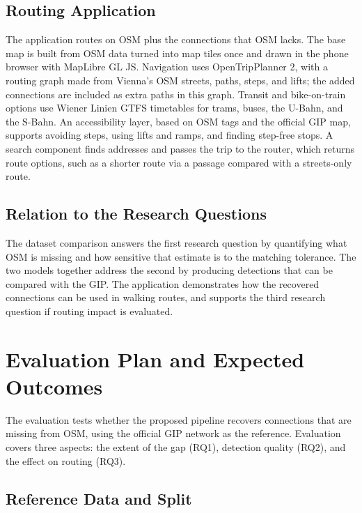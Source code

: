 \documentclass[conference]{IEEEtran}
\begin{document}
\subsection{Routing Application}

The application routes on OSM plus the connections that OSM lacks. The base map is built from OSM data turned into map tiles once and drawn in the phone browser with MapLibre GL JS. Navigation uses OpenTripPlanner 2, with a routing graph made from Vienna's OSM streets, paths, steps, and lifts; the added connections are included as extra paths in this graph. Transit and bike-on-train options use Wiener Linien GTFS timetables for trams, buses, the U-Bahn, and the S-Bahn. An accessibility layer, based on OSM tags and the official GIP map, supports avoiding steps, using lifts and ramps, and finding step-free stops. A search component finds addresses and passes the trip to the router, which returns route options, such as a shorter route via a passage compared with a streets-only route.

\subsection{Relation to the Research Questions}

The dataset comparison answers the first research question by quantifying what OSM is missing and how sensitive that estimate is to the matching tolerance. The two models together address the second by producing detections that can be compared with the GIP. The application demonstrates how the recovered connections can be used in walking routes, and supports the third research question if routing impact is evaluated.


\section{Evaluation Plan and Expected Outcomes}

The evaluation tests whether the proposed pipeline recovers connections that are missing from OSM, using the official GIP network as the reference. Evaluation covers three aspects: the extent of the gap (RQ1), detection quality (RQ2), and the effect on routing (RQ3).

\subsection{Reference Data and Split}
\end{document}
